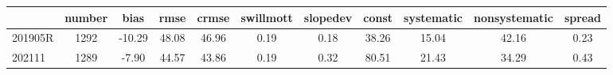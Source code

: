 \begin{tabular}{lcccccccccc}
\toprule
 & number & bias & rmse & crmse & swillmott & slopedev & const & systematic & nonsystematic & spread \\
\midrule
201905R & 1292 & -10.29 & 48.08 & 46.96 & 0.19 & 0.18 & 38.26 & 15.04 & 42.16 & 0.23 \\
202111 & 1289 & -7.90 & 44.57 & 43.86 & 0.19 & 0.32 & 80.51 & 21.43 & 34.29 & 0.43 \\
\bottomrule
\end{tabular}
